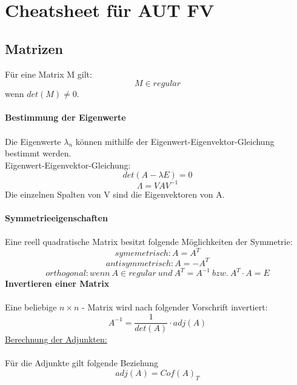 \documentclass[12pt]{article}
\begin{document}
\section{Cheatsheet für AUT FV}
\subsection{Matrizen}
Für eine Matrix M gilt:
\[ M \in regul\ddot{a}r\] 
wenn $ det(M) \neq 0 $. \\ \\
\textbf{Bestimmung der Eigenwerte} \\ \\
Die Eigenwerte $ \lambda_{n} $ können mithilfe der Eigenwert-Eigenvektor-Gleichung bestimmt werden. \\
Eigenwert-Eigenvektor-Gleichung:
\[ det(A - \lambda E) = 0 \]
\[ \Lambda = VAV^{-1} \] 
Die einzelnen Spalten von V sind die Eigenvektoren von A. \\ \\
\textbf{Symmetrieeigenschaften}\\ \\
Eine reell quadratische Matrix besitzt folgende Möglichkeiten der Symmetrie:\\
\[ symemetrisch: A = A^{T}\]
\[ antisymmetrisch: A = -A^{T} \]
\[ orthogonal: wenn \ A \in regul\ddot{a}r \ und \ A^{T} = A^{-1} \ bzw.\  A^{T} \cdot A = E \]
\textbf{Invertieren einer Matrix} \\ \\
Eine beliebige $ n \times n $ - Matrix wird nach folgender Vorschrift invertiert: \\
\[ A^{-1} = \frac{1}{det(A)} \cdot adj(A) \]
\underline{Berechnung der Adjunkten:} \\ \\
Für die Adjunkte gilt folgende Beziehung
\[ adj(A) = Cof(A)_{T} \]
\end{document}
